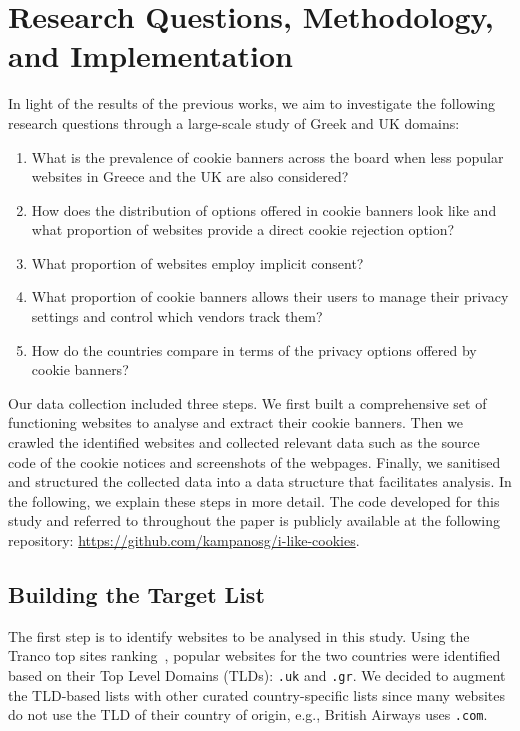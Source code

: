 \section{Research Questions, Methodology, and Implementation}


In light of the results of the previous works, we aim to investigate the following research questions through a large-scale study of Greek and UK domains: 

\begin{enumerate}[label=\textbf{RQ\arabic*}:, ref=RQ\arabic*, leftmargin=1.05cm]
    \item \label{rq:prevalence} What is the prevalence of cookie banners across the board when less popular websites in Greece and the UK are also considered? 
    \item \label{rq:avg_options} How does the distribution of options offered in cookie banners look like and what proportion of websites provide a direct cookie rejection option?
    \item \label{rq:no_options} What proportion of websites employ implicit consent?
    \item \label{rq:manage_options_count} What proportion of cookie banners allows their users to manage their privacy settings and control which vendors track them?
    \item \label{rq:distribution} How do the countries compare in terms of the privacy options offered by cookie banners? 
\end{enumerate}

Our data collection included three steps. We first built a comprehensive set of functioning websites to analyse and extract their cookie banners. Then we crawled the identified websites and collected relevant data such as the source code of the cookie notices and screenshots of the webpages. Finally, we sanitised and structured the collected data into a data structure that facilitates analysis. 
In the following, we explain these steps in more detail. 
The code developed for this study and referred to throughout the paper is publicly available at the following repository: \url{https://github.com/kampanosg/i-like-cookies}. 

\subsection{Building the Target List}
The first step is to identify websites to be analysed in this study. Using the Tranco top sites ranking~\cite{LePochat2019}, popular websites for the two countries were identified based on their Top Level Domains (TLDs): \texttt{.uk} and \texttt{.gr}. 
We decided to augment the TLD-based lists with other curated country-specific lists since many websites do not use the TLD of their country of origin, e.g.,  British Airways uses \texttt{.com}. 

